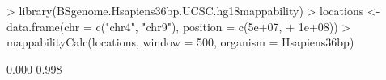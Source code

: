 \begin{Schunk}
\begin{Sinput}
> library(BSgenome.Hsapiens36bp.UCSC.hg18mappability)
> locations <- data.frame(chr = c("chr4", "chr9"), position = c(5e+07, 
+     1e+08))
> mappabilityCalc(locations, window = 500, organism = Hsapiens36bp)
\end{Sinput}
\begin{Soutput}
[1] 0.000 0.998
\end{Soutput}
\end{Schunk}
